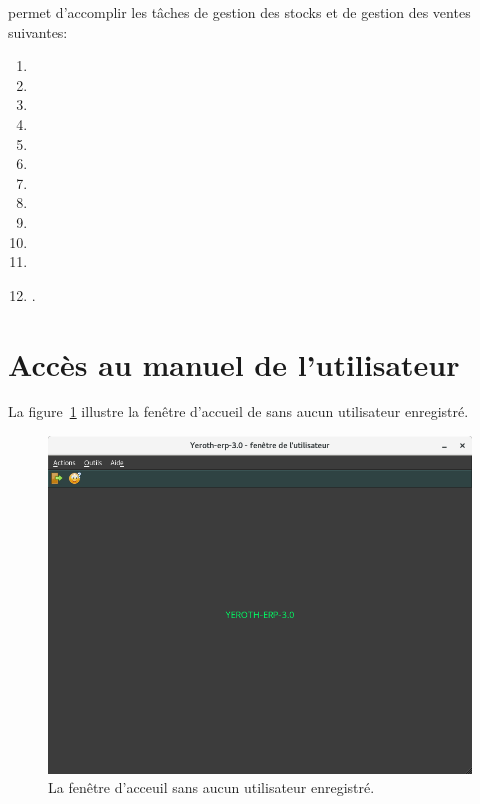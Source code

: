 \yeren permet d'accomplir les t\^aches de gestion
des stocks et de gestion des ventes suivantes:
\begin{enumerate}[1)]
	\item {}	
	\item {}	
	\item {}
	\item {}
	\item {}
	\item {}	
	\item {}
	\item {}	
	\item {}	
	\item {}
	\item {}
	\item {}.\\
\end{enumerate}

\newpage

\section{Acc\`es au manuel de l'utilisateur}

La figure~\ref{fig:fenetre-principale-utilisateur-non-enregistre}
illustre la fen\^etre d'accueil de \yeren sans aucun utilisateur
enregistr\'e.\\

\begin{figure}[!htbp]
\centering
\includegraphics[scale=0.63]{images/yeren-fenetre-principale.png}
\caption{La fen\^etre d'acceuil sans aucun utilisateur enregistr\'e.}
\label{fig:fenetre-principale-utilisateur-non-enregistre}
\end{figure}

